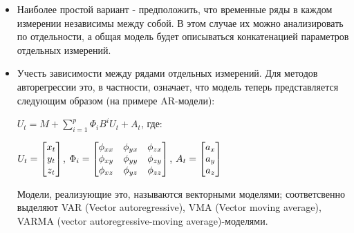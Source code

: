 \begin{itemize}
\item Наиболее простой вариант - предположить, что временные ряды в каждом измерении независимы между собой. В этом случае их можно анализировать по отдельности, а общая модель будет описываться конкатенацией параметров отдельных измерений.
\item Учесть зависимости между рядами отдельных измерений. Для методов авторегрессии это, в частности, означает, что модель теперь представляется следующим образом (на примере AR-модели):

$U_t=M+\sum\limits_{i=1}^p \Phi_i B^i U_t + A_t$,  где:

 $U_t=\begin{bmatrix} x_t \\ y_t \\ z_t \\ \end{bmatrix}$,
 $\Phi_i =\begin{bmatrix} \phi_{xx} & \phi_{yx} & \phi_{zx} \\ \phi_{xy} & \phi_{yy} & \phi_{zy} \\ \phi_{xz} & \phi_{yz} & \phi_{zz} \\ \end{bmatrix}$, 
 $A_t=\begin{bmatrix} a_x \\ a_y \\ a_z \\ \end{bmatrix}$

Модели, реализующие это, называются векторными моделями; соответсвенно выделяют VAR (Vector autoregressive), VMA (Vector moving average), VARMA (vector autoregressive-moving average)-моделями. 
\end{itemize}